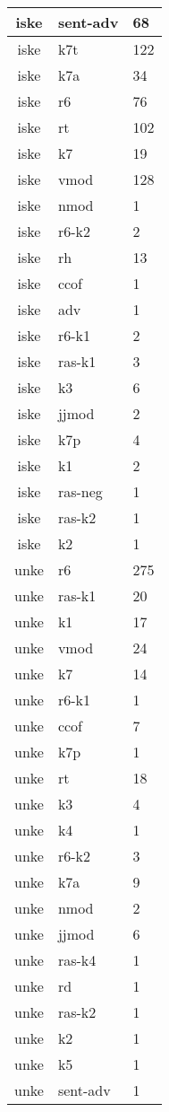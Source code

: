 \documentclass[a4 paper]{article}
\begin{document}
\begin{longtable}{cp{}p{}}
iske & sent-adv & 68\\ \midrule iske & k7t & 122\\ \midrule iske & k7a & 34\\ \midrule iske & r6 & 76\\ \midrule iske & rt & 102\\ \midrule iske & k7 & 19\\ \midrule iske & vmod & 128\\ \midrule iske & nmod & 1\\ \midrule iske & r6-k2 & 2\\ \midrule iske & rh & 13\\ \midrule iske & ccof & 1\\ \midrule iske & adv & 1\\ \midrule iske & r6-k1 & 2\\ \midrule iske & ras-k1 & 3\\ \midrule iske & k3 & 6\\ \midrule iske & jjmod & 2\\ \midrule iske & k7p & 4\\ \midrule iske & k1 & 2\\ \midrule iske & ras-neg & 1\\ \midrule iske & ras-k2 & 1\\ \midrule iske & k2 & 1\\ \midrule 
unke & r6 & 275\\ \midrule unke & ras-k1 & 20\\ \midrule unke & k1 & 17\\ \midrule unke & vmod & 24\\ \midrule unke & k7 & 14\\ \midrule unke & r6-k1 & 1\\ \midrule unke & ccof & 7\\ \midrule unke & k7p & 1\\ \midrule unke & rt & 18\\ \midrule unke & k3 & 4\\ \midrule unke & k4 & 1\\ \midrule unke & r6-k2 & 3\\ \midrule unke & k7a & 9\\ \midrule unke & nmod & 2\\ \midrule unke & jjmod & 6\\ \midrule unke & ras-k4 & 1\\ \midrule unke & rd & 1\\ \midrule unke & ras-k2 & 1\\ \midrule unke & k2 & 1\\ \midrule unke & k5 & 1\\ \midrule unke & sent-adv & 1\\ \midrule 

\end{longtable}
\end{document}
